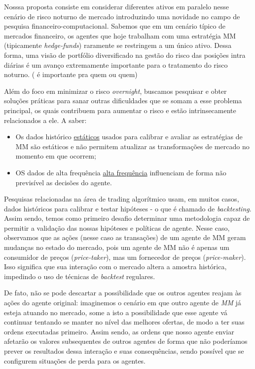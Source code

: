 Nosssa proposta consiste em considerar diferentes ativos em paralelo nesse cenário de risco noturno de mercado introduzindo uma novidade no campo de pesquisa financeiro-computacional. Sabemos que em um cenário típico de mercados financeiro, os agentes que hoje trabalham com uma estratégia MM (tipicamente \textit{hedge-funds}) raramente se restringem a um único ativo. Dessa forma, uma visão de portfólio diversificado na gestão do risco das posições intra diárias é um avanço extremamente importante para o tratamento do risco noturno. ( é importante pra quem ou quem)

Além do foco em minimizar o risco \textit{overnight}, buscamos pesquisar e obter soluções práticas para sanar outras dificuldades que se somam a esse problema principal, os quais contribuem para aumentar o risco e estão intrinsecamente relacionados a ele. A saber:
\begin{itemize}
    \item Os dados histórico \underline{estáticos} usados para calibrar e avaliar as estratégias de MM são estáticos e não permitem atualizar as transformações de mercado no momento em que ocorrem;
    \item OS dados de alta frequência \underline{alta frequência} influenciam de forma não previsível as decisões do agente.
\end{itemize}


Pesquisas relacionadas na área de trading algorítmico usam, em muitos casos, dados históricos para calibrar e testar hipóteses - o que é chamado de \textit{backtesting}. Assim sendo, temos como primeiro desafio determinar uma metodologia capaz de permitir a validação das nossas hipóteses e políticas de agente. Nesse caso, observamos que as ações (nesse caso as transações) de um agente de MM geram mudanças no estado do mercado, pois um agente de MM não é apenas um consumidor de preços (\textit{price-taker}), mas um fornecedor de preços (\textit{price-maker}). Isso significa que sua interação com o mercado altera a amostra histórica, impedindo o uso de técnicas de \textit{backtest} regulares.

De fato, não se pode descartar
a possibilidade que os outros agentes reajam às ações do agente original: imaginemos o cenário em que outro agente de \textit{MM} já esteja atuando no mercado, some a isto a possibilidade que esse agente vá continuar tentando se manter no nível das melhores ofertas, de modo a ter suas ordens executadas primeiro. Assim sendo, as ordens que nosso agente enviar afetarão os valores subsequentes de outros agentes de forma que não poderíamos prever os resultados dessa interação e suas consequências, sendo possível que se configurem situações de perda para os agentes.

